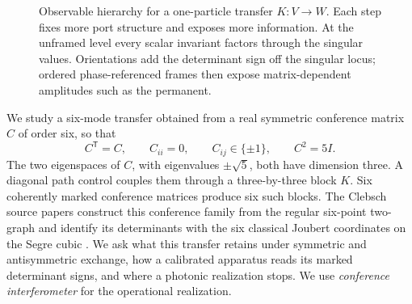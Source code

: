\documentclass[11pt]{article}
\theoremstyle{remark}
\newcommand{\per}{\operatorname{per}}
\begin{document}
\begin{figure}[t]
\centering
{}
\caption{Observable hierarchy for a one-particle transfer \(K:V\to W\).
Each step fixes more port structure and exposes more information.
At the unframed level every scalar invariant factors through the singular
values.  Orientations add the determinant sign off the singular locus;
ordered phase-referenced frames then expose matrix-dependent amplitudes such
as the permanent.}
\label{fig:observable-hierarchy}
\end{figure}

We study a six-mode transfer obtained from a real symmetric conference
matrix \(C\) of order six, so that
\[
 C^{\mathsf T}=C,\qquad C_{ii}=0,\qquad C_{ij}\in\{\pm1\},
 \qquad C^2=5I.
\]
The two eigenspaces of \(C\), with eigenvalues \(\pm\sqrt5\), both have
dimension three.  A diagonal path control couples them through a
three-by-three block \(K\).  Six coherently marked conference matrices produce
six such blocks.  The Clebsch source papers construct this conference family from
the regular six-point two-graph and identify its determinants with the six
classical Joubert coordinates on the Segre cubic
\cite{ClebschI,ClebschIII}.  We ask what this transfer retains under
symmetric and antisymmetric exchange, how a calibrated apparatus reads its
marked determinant signs, and where a photonic realization stops.  We use
\emph{conference interferometer} for the operational realization.
\end{document}
